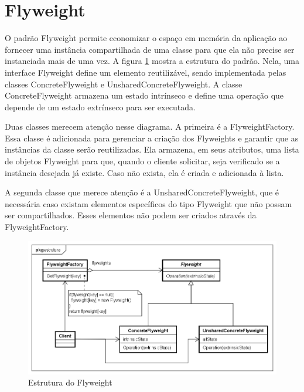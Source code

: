 \section{Flyweight}

O padrão Flyweight permite economizar o espaço em memória 
da aplicação ao fornecer uma instância compartilhada de 
uma classe para que ela não precise ser instanciada 
mais de uma vez. A figura \ref{flyweight_struct} mostra 
a estrutura do padrão. Nela, uma interface Flyweight 
define um elemento reutilizável, sendo implementada 
pelas classes ConcreteFlyweight e UnsharedConcreteFlyweight. 
A classe ConcreteFlyweight armazena um estado intrínseco 
e define uma operação que depende de um estado extrínseco 
para ser executada. 

Duas classes merecem atenção nesse diagrama. A primeira 
é a FlyweightFactory. Essa classe é adicionada para 
gerenciar a criação dos Flyweights e garantir que as 
instâncias da classe serão reutilizadas. Ela armazena, em 
seus atributos, uma lista de objetos Flyweight para que, 
quando o cliente solicitar, seja verificado se a instância 
desejada já existe. Caso não exista, ela é criada e 
adicionada à lista. 

A segunda classe que merece atenção é a UnsharedConcreteFlyweight, 
que é necessária caso existam elementos específicos 
do tipo Flyweight que não possam ser compartilhados. 
Esses elementos não podem ser criados através da 
FlyweightFactory.

\begin{figure}[htb]
	\caption{\label{flyweight_struct}Estrutura do Flyweight}
	\begin{center}
	    \includegraphics[scale=0.5]{5_padroes-contexto-funcional/5.2_estruturais/5.2.6_flyweight/flyweight_estrutura.png}
	\end{center}
\end{figure}

